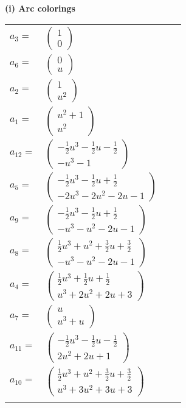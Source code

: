 \documentclass[1p]{elsarticle_modified}
\theoremstyle{definition}
\begin{document}
\flushleft \textbf{(i) Arc colorings}\\
\begin{tabular}{m{7pt} m{180pt} m{7pt} m{180pt} }
\flushright $a_{3}=$&$\begin{pmatrix}1\\0\end{pmatrix}$ \\
\flushright $a_{6}=$&$\begin{pmatrix}0\\u\end{pmatrix}$ \\
\flushright $a_{2}=$&$\begin{pmatrix}1\\u^2\end{pmatrix}$ \\
\flushright $a_{1}=$&$\begin{pmatrix}u^2+1\\u^2\end{pmatrix}$ \\
\flushright $a_{12}=$&$\begin{pmatrix}-\frac{1}{2} u^3-\frac{1}{2} u-\frac{1}{2}\\- u^3-1\end{pmatrix}$ \\
\flushright $a_{5}=$&$\begin{pmatrix}-\frac{1}{2} u^3-\frac{1}{2} u+\frac{1}{2}\\-2 u^3-2 u^2-2 u-1\end{pmatrix}$ \\
\flushright $a_{9}=$&$\begin{pmatrix}-\frac{1}{2} u^3-\frac{1}{2} u+\frac{1}{2}\\- u^3- u^2-2 u-1\end{pmatrix}$ \\
\flushright $a_{8}=$&$\begin{pmatrix}\frac{1}{2} u^3+u^2+\frac{3}{2} u+\frac{3}{2}\\- u^3- u^2-2 u-1\end{pmatrix}$ \\
\flushright $a_{4}=$&$\begin{pmatrix}\frac{1}{2} u^3+\frac{1}{2} u+\frac{1}{2}\\u^3+2 u^2+2 u+3\end{pmatrix}$ \\
\flushright $a_{7}=$&$\begin{pmatrix}u\\u^3+u\end{pmatrix}$ \\
\flushright $a_{11}=$&$\begin{pmatrix}-\frac{1}{2} u^3-\frac{1}{2} u-\frac{1}{2}\\2 u^2+2 u+1\end{pmatrix}$ \\
\flushright $a_{10}=$&$\begin{pmatrix}\frac{1}{2} u^3+u^2+\frac{3}{2} u+\frac{3}{2}\\u^3+3 u^2+3 u+3\end{pmatrix}$\\&\end{tabular}
\end{document}
